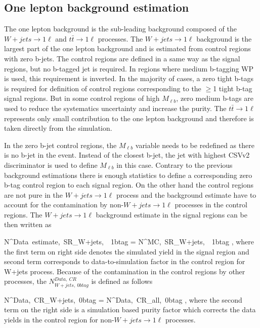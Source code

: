 \subsection{One lepton background estimation}


The  one lepton background is the sub-leading background composed of the $W+jets \to 1\ell$  and $t\bar{t} \to 1\ell$ processes. The $W+jets \to 1\ell$ background  is the largest part of the one lepton background and is estimated from control regions with zero b-jets. The control regions are defined in a same way as the signal regions, but no b-tagged jet is required. In regions where medium b-tagging WP is used, this requirement is inverted. In the majority of cases, a zero tight b-tags is required for definition of control regions corresponding to the $\geq$1 tight b-tag signal regions. But in some control regions of high $M_{\ell b}$, zero medium b-tags are used to reduce the systematics uncertainty and increase the purity. The  $t\bar{t} \to 1\ell$ represents only small contribution to the one lepton background and therefore is taken directly from the simulation.

In the zero b-jet control regions, the $M_{\ell b}$ variable needs to be redefined as there is no b-jet in the event. Instead of the closest b-jet, the jet with highest CSVv2 discriminator is used to define $M_{\ell b}$ in this case. Contrary to the previous background estimations there is enough statistics to define a corresponding zero b-tag control region to each signal region. On the other hand the control regions are not pure in the $W+jets \to 1\ell$  process and the background estimate have to account for the contamination by non-$W+jets \to 1\ell$  processes in the control regions. The $W+jets \to 1\ell$  background estimate in the signal regions can be then written as

{
N^{Data~estimate,~SR}_{W+jets,~\geq~1btag}  = N^{MC,~SR}_{W+jets,~\geq~1btag} \times  {},
}
where the first term on right side denotes the simulated yield in the signal region and second term corresponds to data-to-simulation factor in the control region for W+jets process. Because of the contamination in the control regions by other processes, the $N^{Data,~CR}_{W+jets,~0btag}$ is defined as follows


{
N^{Data,~CR}_{W+jets,~0btag} = N^{Data,~CR}_{all,~0btag} \times {} ,
}
where the second term on the right side is a simulation based purity factor which corrects the data yields in the control region for non-$W+jets \to 1\ell$  processes.

